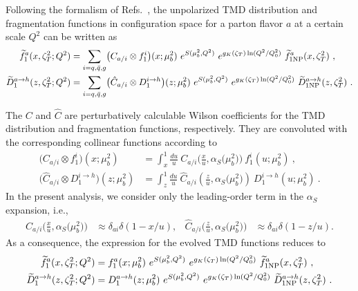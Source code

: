 \documentclass[aps,preprintnumbers,showpacs,nofootinbib,superscriptaddress,floatfix]{revtex4}
\newcommand{\bT}{\zeta_T}
\begin{document}
Following the formalism of Refs.~\cite{Collins:2011zzd,Aybat:2011zv}, the
unpolarized TMD distribution and fragmentation functions in configuration
space for a parton flavor $a$ at a certain scale $Q^2$ can be written as 
\begin{align}   
\widetilde{f}_1^a (x,  \bT^2; Q^2) &= \sum_{i=q,\bar q,g} \bigl( C_{a/i} \otimes f_1^i \bigr) (x; \mu_b^2) 
\  e^{S (\mu_b^2, Q^2)} \  e^{g_K(\bT) \ln (Q^2 / Q_0^2)} \  \widetilde{f}_{1 {\rm NP}}^a (x, \bT^2) \ ,
\label{e:TMDevol1} \\
\widetilde{D}_1^{a\to h} (z, \bT^2; Q^2) &= \sum_{i=q,\bar q,g} \bigl( \hat{C}_{a/i} \otimes D_1^{i\to h} \bigr) (z; \mu_b^2) \  e^{S (\mu_b^2, Q^2)} \  e^{g_K( \bT) \ln (Q^2 / Q_0^2)} \  \widetilde{D}_{1 {\rm NP}}^{a\to h} (z, \bT^2) \  .
\label{e:TMDevol2}
\end{align}

The $C$ and $\hat{C}$ are perturbatively calculable Wilson coefficients for
the TMD distribution and fragmentation functions, respectively. They are
convoluted with the corresponding collinear functions according to 
\begin{align}
\bigl( C_{a/i} \otimes f_1^i \bigr) (x; \mu_b^2) &=
  \int_x^1 \frac{du}{u}\  
        C_{a/i} \Big( \frac{x}{u}, \alpha_S\big(\mu_b^2\big)  \Big) \  
        f_1^i (u; \mu_b^2) \  , 
\label{e:WC1} \\
\bigl( \hat{C}_{a/i} \otimes D_1^{i\to h} \bigr) (z; \mu_b^2) &= \int_z^1 \frac{du}{u}\  \hat{C}_{a/i} \left( \frac{z}{u}, \alpha_S\big(\mu_b^2\big) \right) \  D_1^{i\to h} (u; \mu_b^2) \  . 
\label{e:WC2}
\end{align}
In the present analysis, we consider only the leading-order term
in the $\alpha_S$ expansion, i.e., 
\begin{align} 
C_{a/i} \Big( \frac{x}{u}, \alpha_S\big(\mu_b^2\big)  \Big) &\approx
\delta_{ai} \delta(1-x/u),
&
\hat{C}_{a/i} \Big( \frac{z}{u}, \alpha_S\big(\mu_b^2\big)  \Big) &\approx
\delta_{ai} \delta(1-z/u).
\end{align}  
As a consequence, the expression for the evolved TMD functions reduces to
\begin{align}   
\widetilde{f}_1^a (x,  \bT^2; Q^2) &= f_1^a (x ; \mu_b^2) 
\  e^{S (\mu_b^2, Q^2)} \  e^{g_K(\bT) \ln (Q^2 / Q_0^2)} \  \widetilde{f}_{1 {\rm NP}}^a (x, \bT^2) \ ,
\label{e:TMDevol1b} \\
\widetilde{D}_1^{a\to h} (z, \bT^2; Q^2) &= D_1^{a\to h} (z; \mu_b^2) \  e^{S (\mu_b^2, Q^2)} \  e^{g_K( \bT) \ln (Q^2 / Q_0^2)} \  \widetilde{D}_{1 {\rm NP}}^{a\to h} (z, \bT^2) \  .
\label{e:TMDevol2b}
\end{align}
\end{document}
